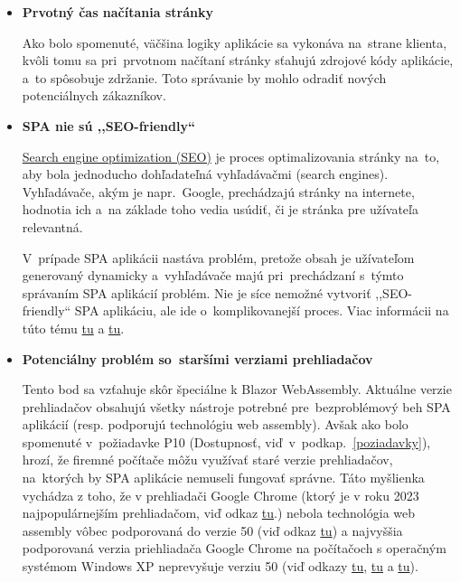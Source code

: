 \begin{itemize}
\item \textbf{Prvotný čas načítania stránky}

Ako bolo spomenuté, väčšina logiky aplikácie sa vykonáva na~strane klienta, kvôli tomu sa pri~prvotnom načítaní stránky sťahujú zdrojové kódy aplikácie, a~to spôsobuje zdržanie. Toto správanie by mohlo odradiť nových potenciálnych zákazníkov.

\item \textbf{SPA nie sú ,,SEO-friendly``}

\href{https://mailchimp.com/marketing-glossary/seo/}{Search engine optimization (SEO)} je proces optimalizovania stránky na~to, aby bola jednoducho dohľadateľná vyhľadávačmi (search engines). Vyhľadávače, akým je napr.~Google, prechádzajú stránky na internete, hodnotia ich a~na základe toho vedia usúdiť, či je stránka pre užívateľa relevantná.

V~prípade SPA aplikácii nastáva problém, pretože obsah je užívateľom generovaný dynamicky a~vyhľadávače majú pri~prechádzaní s~týmto správaním SPA aplikácií problém. Nie je síce nemožné vytvoriť ,,SEO-friendly`` SPA aplikáciu, ale ide o~komplikovanejší proces. Viac informácii na túto tému \href{https://novateus.com/blog/single-page-applications-spas-most-discussed-pros-cons/}{tu} a \href{https://www.cloudways.com/blog/single-page-website-spa-seo/}{tu}.

\item \textbf{Potenciálny problém so~staršími verziami prehliadačov}

Tento bod sa vzťahuje skôr špeciálne k Blazor WebAssembly. Aktuálne verzie prehliadačov obsahujú všetky nástroje potrebné pre~bezproblémový beh SPA aplikácií (resp. podporujú technológiu web assembly). Avšak ako bolo spomenuté v~požiadavke P10 (Dostupnosť, viď~v~podkap.~\ref{poziadavky}), hrozí, že firemné počítače môžu využívať staré verzie prehliadačov, na~ktorých by SPA aplikácie nemuseli fungovať správne. Táto myšlienka vychádza z toho, že v prehliadači Google Chrome (ktorý je v roku 2023 najpopulárnejším prehliadačom, viď odkaz \href{https://www.oberlo.com/statistics/browser-market-share}{tu}.) nebola technológia web assembly vôbec podporovaná do verzie 50 (viď odkaz \href{https://caniuse.com/wasm}{tu}) a najvyššia podporovaná verzia priehliadača Google Chrome na počítačoch s operačným systémom Windows XP neprevyšuje verziu 50 (viď odkazy \href{https://msfn.org/board/topic/175404-chrome-49-update/}{tu}, \href{https://chrome.googleblog.com/2015/11/updates-to-chrome-platform-support.html}{tu} a \href{https://chromereleases.googleblog.com/2015/09/}{tu}).
\end{itemize}


